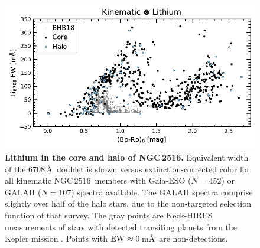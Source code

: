 \documentclass[12pt,twocolumn,tighten]{aastex63}
\newcommand{\cn}{NGC\,2516} %
\begin{document}
\begin{figure}[t]
	\begin{center}
		\leavevmode
			\includegraphics[width=1\textwidth]{f5a.pdf}
	\end{center}
	\vspace{-0.7cm}
  \caption{ {\bf Lithium in the core and halo of NGC\,2516.}
  Equivalent width of the 6708\,\AA\ doublet is shown
  versus extinction-corrected color for all kinematic \cn\ members
  with Gaia-ESO ($N=452$) or GALAH ($N=107$) spectra available.
  The GALAH spectra comprise slightly over half of the halo stars,
  due to the non-targeted selection function of that survey.
  The gray points are Keck-HIRES measurements of stars with detected
  transiting planets from the Kepler mission
  \citep{berger_identifying_2018}.
  Points with ${\rm EW}\approx0\,$m\AA\ are non-detections.
  \label{fig:lithiumcorehalo}
  }
\end{figure}
\end{document}
